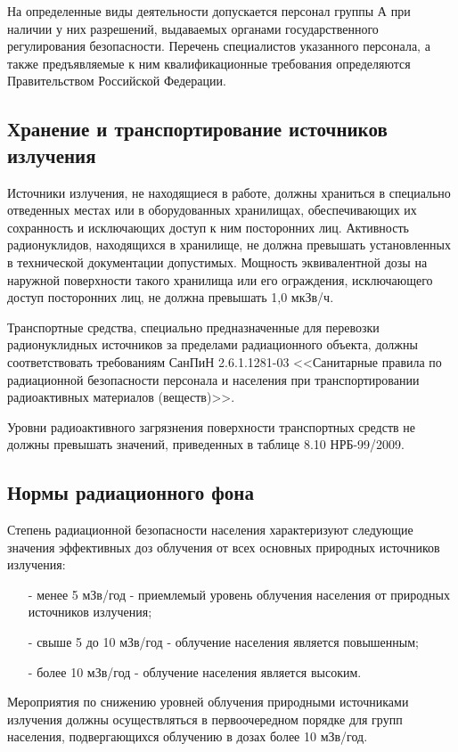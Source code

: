 	На определенные виды деятельности допускается персонал группы А при наличии 
	у них разрешений, выдаваемых органами государственного регулирования 
	безопасности. Перечень специалистов указанного персонала, а также 
	предъявляемые к ним квалификационные требования определяются Правительством 
	Российской Федерации.

\subsection{Хранение и транспортирование источников излучения} 
\label{subsect1_1_5}
	Источники излучения, не находящиеся в работе, должны храниться в 
	специально отведенных местах или в оборудованных хранилищах, 
	обеспечивающих их сохранность и исключающих доступ к ним посторонних лиц. 
	Активность радионуклидов, находящихся в хранилище, не должна превышать 
	установленных в технической документации допустимых. Мощность эквивалентной 
	дозы на наружной поверхности такого хранилища или его ограждения, 
	исключающего доступ посторонних лиц, не должна превышать 1,0 мкЗв/ч.

	Транспортные средства, специально предназначенные для перевозки 
	радионуклидных источников за пределами радиационного объекта, должны 
	соответствовать требованиям СанПиН 2.6.1.1281-03 <<Санитарные правила по 
	радиационной безопасности персонала и населения при транспортировании 
	радиоактивных материалов (веществ)>>.

	Уровни радиоактивного загрязнения поверхности транспортных средств не 
	должны превышать значений, приведенных в таблице 8.10 НРБ-99/2009.

\subsection{Нормы радиационного фона} \label{subsect1_1_6}
	Степень радиационной безопасности населения характеризуют следующие 
	значения эффективных доз облучения от всех основных природных источников 
	излучения:
	\begin{itemize}
		\item[-] менее 5 мЗв/год - приемлемый уровень облучения населения 
			от природных источников излучения;
		\item[-] свыше 5 до 10 мЗв/год - облучение населения является 
			повышенным;
		\item[-] более 10 мЗв/год - облучение населения является высоким.
	\end{itemize}

	Мероприятия по снижению уровней облучения природными источниками излучения 
	должны осуществляться в первоочередном порядке для групп населения, 
	подвергающихся облучению в дозах более 10 мЗв/год.

